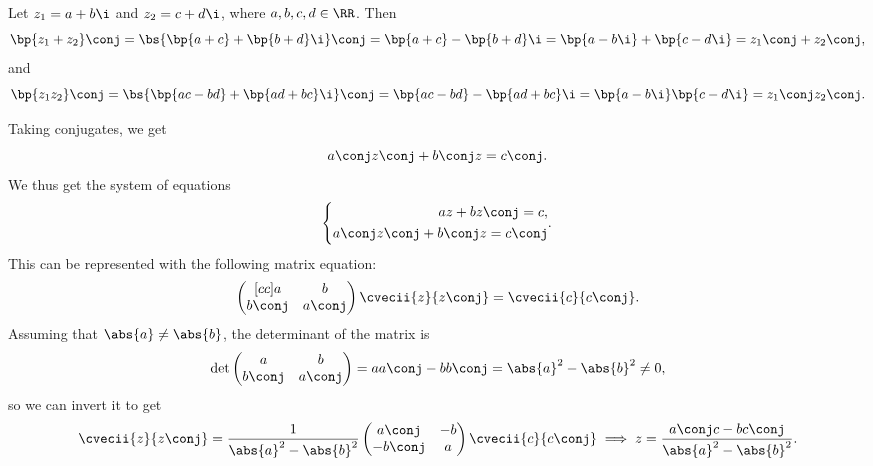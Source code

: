 \begin{solution}
    \begin{ppart}
        Let $z_1 = a + b \i$ and $z_2 = c + d\i$, where $a, b, c, d \in \RR$. Then \[\bp{z_1 + z_2}\conj = \bs{\bp{a + c} + \bp{b + d} \i }\conj = \bp{a + c} - \bp{b + d} \i = \bp{a - b \i} + \bp{c - d\i} = z_1\conj + z_2 \conj,\] and \[\bp{z_1 z_2}\conj = \bs{\bp{ac-bd} + \bp{ad + bc}\i}\conj = \bp{ac-bd} - \bp{ad + bc}\i = \bp{a - b\i}\bp{c - d\i} = z_1\conj z_2\conj.\]
    \end{ppart}
    \begin{ppart}
        Taking conjugates, we get \[a\conj z\conj + b\conj z = c\conj.\] We thus get the system of equations \[\left\{\begin{aligned}
            az + bz\conj = c,\\
            a\conj z\conj + b\conj z = c\conj
        \end{aligned}.\right.\] This can be represented with the following matrix equation:\[\begin{pmatrix}[cc]a & b \\ b\conj & a \conj\end{pmatrix}\cvecii{z}{z\conj} = \cvecii{c}{c\conj}.\] Assuming that $\abs{a} \neq \abs{b}$, the determinant of the matrix is \[\det \begin{pmatrix}a & b \\ b\conj & a \conj\end{pmatrix} = aa\conj - bb\conj = \abs{a}^2 - \abs{b}^2 \neq 0,\] so we can invert it to get \[\cvecii{z}{z\conj} = \frac1{\abs{a}^2 - \abs{b}^2} \begin{pmatrix}a\conj & -b \\ -b\conj & a \end{pmatrix} \cvecii{c}{c\conj} \implies z = \frac{a\conj c - b c\conj}{\abs{a}^2 - \abs{b}^2}.\]
    \end{ppart}
    \begin{ppart}

\end{ppart}
\end{solution}
